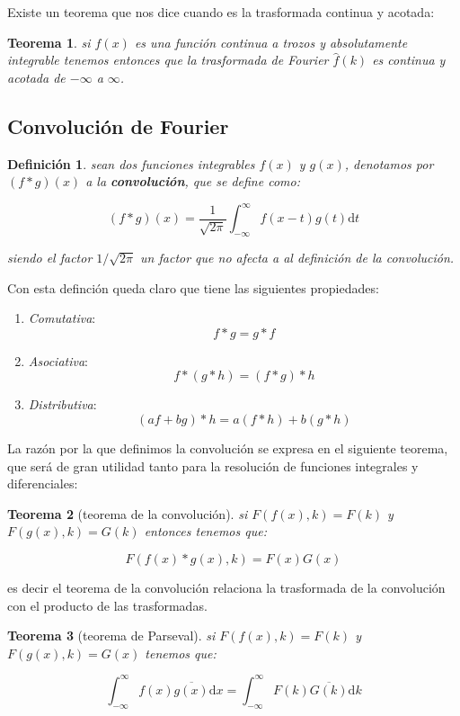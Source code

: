 \documentclass[12pt]{book}
\newcommand{\D}{\mathrm{d}}
\newcommand{\inti}{\int_{-\infty}^{\infty}}
\newcommand{\hatf}{\widehat{f}}
\newtheorem{theorem}{Teorema}[section]
\newtheorem{definicion}{Definición}[section]
\begin{document}
Existe un teorema que nos dice cuando es la trasformada continua y acotada:

\begin{theorem}
si $f(x)$ es una función continua a trozos y absolutamente integrable tenemos entonces que la trasformada de Fourier $\hatf (k)$ es continua y acotada de $-\infty$ a $\infty$.
\end{theorem}

\subsection{Convolución de Fourier}


\begin{definicion}
sean dos funciones integrables $f(x)$ y $g(x)$, denotamos por $(f * g)(x)$ a la \textbf{convolución}, que se define como:

\begin{equation}
(f * g)(x) = \dfrac{1}{\sqrt{2 \pi}} \int_{-\infty}^{\infty}  f(x-t) g(t) \D t
\end{equation}

siendo el factor $1/\sqrt{2 \pi}$ un factor que no afecta a al definición de la convolución.
\end{definicion}


Con esta definción queda claro que tiene las siguientes propiedades:

\begin{enumerate}
\item \textit{Comutativa}: $$ f * g = g * f $$
\item \textit{Asociativa}: $$ f * (g * h) = (f * g) * h $$
\item \textit{Distributiva}: $$ (a f + b g) * h = a (f * h) + b (g * h) $$
\end{enumerate}

La razón por la que definimos la convolución se expresa en el siguiente teorema, que será de gran utilidad tanto para la resolución de funciones integrales y diferenciales:

\begin{theorem}[teorema de la convolución]
si $F(f(x),k) = F(k)$ y $F(g(x),k) = G(k)$ entonces tenemos que:

$$ F(f(x) * g(x) , k) = F(x) G(x) $$
\end{theorem}

es decir el teorema de la convolución relaciona la trasformada de la convolución con el producto de las trasformadas. 


\begin{theorem}[teorema de Parseval] si $F(f(x),k)  = F(k)$ y $F(g(x),k) = G(x)$ tenemos que:

$$  \inti f(x) \overline{g(x)} \D x   = \inti F(k) \overline{G(k)} \D k  $$
\end{theorem}
\end{document}
